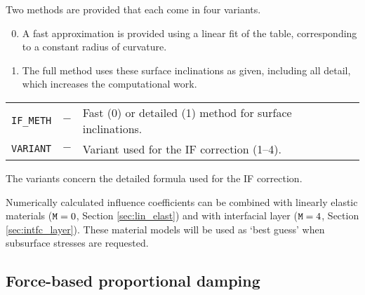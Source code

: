 \documentclass[12pt]{report}
\renewcommand{\magenta}[1]{}
\newenvironment{inputvars}{\vspace{0.4\baselineskip}%

\begin{tabular}{>{\raggedright}p{22mm}p{19mm}p{113mm}}}{
\end{tabular}

}
\newcommand{\inpvar}[3]{{\small\tt #1} & $#2$ & #3 \\[1ex]}
\begin{document}
Two methods are provided that each come in four variants. 
\begin{enumerate}\setcounter{enumi}{-1}
\item A fast approximation is provided using a linear fit of the table,
        corresponding to a constant radius of curvature.
\item The full method uses these surface inclinations as given,
        including all detail, which increases the computational work.
\end{enumerate}
\begin{inputvars}
\inpvar{IF\_METH}{-}{Fast (0) or detailed (1) method for surface
        inclinations.}
\inpvar{VARIANT}{-}{Variant used for the IF correction (1--4).}
\end{inputvars}
The variants concern the detailed formula used for the IF correction.
\magenta{
\begin{enumerate}
\item Blanco-proposal, decomposing pressures $\vec{p}$;
\item same, without $B_{xn}$ correction;
\item Vollebregt-proposal, transforming displacements $\vec{u}$;
\item Combined proposal, using $\vec{p}$ and $\vec{u}$.
\end{enumerate}
}

Numerically calculated influence coefficients can be combined with linearly
elastic materials (${\tt M}=0$, Section \ref{sec:lin_elast}) and with
interfacial layer (${\tt M}=4$, Section \ref{sec:intfc_layer}). These
material models will be used as `best guess' when subsurface stresses
are requested.

\subsection{Force-based proportional damping}
\label{sec:damping}
\end{document}
